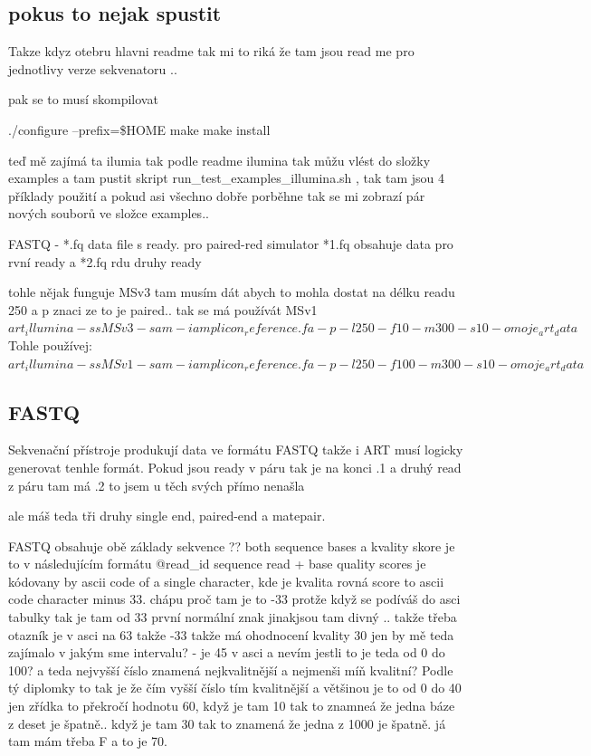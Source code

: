 \documentclass[czech,DP]{thesiskiv}
\numberwithin{equation}{section}
\begin{document}
\subsection{pokus to nejak spustit}
Takze kdyz otebru hlavni readme tak mi to riká že tam jsou read me pro jednotlivy verze sekvenatoru ..

pak se to musí skompilovat 

./configure --prefix=\$HOME
	       	make
	       	make install	 
	 
teď mě zajímá ta ilumia tak podle readme ilumina tak můžu vlést do složky examples a tam pustit skript run\_test\_examples\_illumina.sh , tak tam jsou 4 příklady použití 
a pokud asi všechno dobře porběhne tak se mi zobrazí pár nových souborů ve složce examples.. 

FASTQ - *.fq data file s ready. pro paired-red simulator
*1.fq obsahuje data pro rvní ready a *2.fq rdu druhy ready

tohle nějak funguje
MSv3 tam musím dát abych to mohla dostat na délku readu 250 a p znaci ze to je paired.. 
tak se má používát MSv1
$art_illumina -ss MSv3 -sam -i amplicon_reference.fa -p -l 250 -f 10 -m 300 -s 10 -o moje_art_data$
Tohle používej:
$art_illumina -ss MSv1 -sam -i amplicon_reference.fa -p -l 250 -f 100 -m 300 -s 10 -o moje_art_data$

\subsection{FASTQ}
Sekvenační přístroje produkují data ve formátu FASTQ takže i ART musí logicky generovat tenhle formát.
Pokud jsou ready v páru tak je na konci .1
a druhý read z páru tam má .2 to jsem u těch svých přímo nenašla 

ale máš teda tři druhy single end, paired-end a matepair. 

FASTQ obsahuje obě základy sekvence ?? both sequence bases a kvality skore je to v následujícím formátu
@read\_id
sequence read
+
base quality scores je kódovany by ascii code of a single character, kde je kvalita rovná score to ascii code character minus 33. chápu proč tam je to -33 protže když se podíváš do asci tabulky tak je tam od 33 první normální znak jinakjsou tam divný .. 
takže třeba otazník je v asci na 63 takže -33 takže má ohodnocení kvality 30
jen by mě teda zajímalo v jakým sme intervalu? - je 45 v asci a nevím jestli to je teda od 0 do 100?  a teda nejvyšší číslo znamená nejkvalitnější a nejmenši míň kvalitní? Podle tý diplomky to tak je že čím vyšší číslo tím kvalitnější a většinou je to od 0 do 40 jen zřídka to překročí hodnotu 60, když je tam 10 tak to znamneá že jedna báze z deset je špatně.. když je tam 30 tak to znamená že jedna z 1000 je špatně.
já tam mám třeba F a to je 70.
\end{document}
